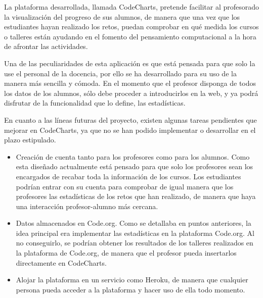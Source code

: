 

La plataforma desarrollada, llamada CodeCharts, pretende facilitar al profesorado la visualización del progreso de sus alumnos, de manera que una vez que los estudiantes hayan realizado los retos, puedan comprobar en qué medida los cursos
o talleres están ayudando en el fomento del pensamiento computacional a la hora de afrontar las actividades.

Una de las peculiaridades de esta aplicación es que está pensada para que solo la use el personal de la docencia, por ello se ha desarrollado para su uso de la manera más sencilla y cómoda. En el momento que el profesor disponga de todos los datos de los alumnos,
sólo debe proceder a introducirlos en la web, y ya podrá disfrutar de la funcionalidad que lo define, las estadísticas.

En cuanto a las líneas futuras del proyecto, existen algunas tareas pendientes que mejorar en CodeCharts, ya que no se han podido implementar o desarrollar en el plazo estipulado.

\begin{itemize}
    \item Creación de cuenta tanto para los profesores como para los alumnos. Como esta diseñado actualmente está pensado para que solo los profesores sean los encargados de recabar toda la información de los cursos. Los estudiantes podrían entrar
    con su cuenta para comprobar de igual manera que los profesores las estadísticas de los retos que han realizado, de manera que haya una interacción profesor-alumno más cercana.
    \item Datos almacenados en Code.org. Como se detallaba en puntos anteriores, la idea principal era implementar las estadísticas en la plataforma Code.org. Al no conseguirlo, se podrían obtener los resultados de los talleres realizados en la plataforma de Code.org, 
    de manera que el profesor pueda insertarlos directamente en CodeCharts.
    \item Alojar la plataforma en un servicio como Heroku, de manera que cualquier persona pueda acceder a la plataforma y hacer uso de ella todo momento.
\end{itemize}




